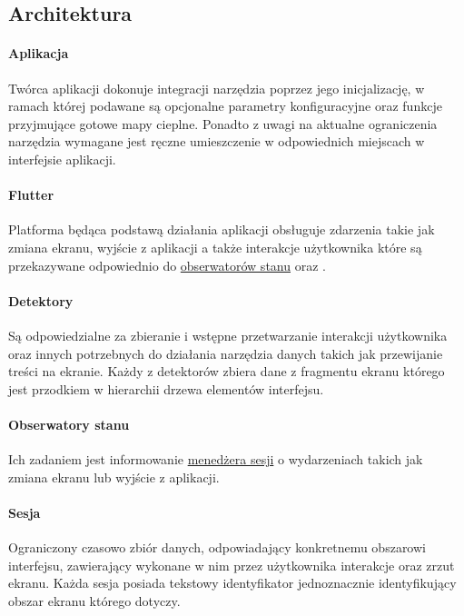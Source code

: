 \subsection{Architektura}

\paragraph{Aplikacja}
Twórca aplikacji dokonuje integracji narzędzia poprzez jego inicjalizację, w ramach której podawane są  opcjonalne parametry konfiguracyjne oraz funkcje przyjmujące gotowe mapy cieplne. Ponadto z uwagi na aktualne ograniczenia narzędzia wymagane jest ręczne umieszczenie \detector[ów] w odpowiednich miejscach w interfejsie aplikacji.

\paragraph{Flutter} Platforma będąca podstawą działania aplikacji obsługuje zdarzenia takie jak zmiana ekranu, wyjście z aplikacji a także interakcje użytkownika które są przekazywane odpowiednio do \hyperref[par:rs_observers]{obserwatorów stanu} oraz \detector[ów].

\paragraph{Detektory} 
\label{par:rs_detectors}
Są odpowiedzialne za zbieranie i wstępne przetwarzanie interakcji użytkownika oraz innych potrzebnych do działania narzędzia danych takich jak przewijanie treści na ekranie. Każdy z detektorów zbiera dane z fragmentu ekranu którego jest przodkiem w hierarchii drzewa elementów interfejsu.

\paragraph{Obserwatory stanu} 
\label{par:rs_observers}
Ich zadaniem jest informowanie \hyperref[par:rs_session_manager]{menedżera sesji} o wydarzeniach takich jak zmiana ekranu lub wyjście z aplikacji.

\paragraph{Sesja}
\label{par:rs_session}
Ograniczony czasowo zbiór danych, odpowiadający konkretnemu obszarowi interfejsu, zawierający wykonane w nim przez użytkownika interakcje oraz zrzut ekranu. Każda sesja posiada tekstowy identyfikator jednoznacznie identyfikujący obszar ekranu którego dotyczy.


